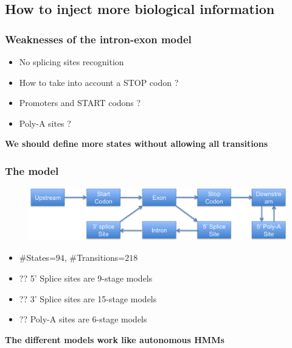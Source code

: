 \documentclass{beamer}[12pt]
\begin{document}
\subsection{How to inject more biological information}
\begin{frame}
\frametitle{Weaknesses of the intron-exon model}
	\begin{itemize}
		\item No splicing sites recognition 
		\item How to take into account a STOP codon ? 
		\item Promoters and START codons ? 
		\item Poly-A sites ?
	\end{itemize}
	
	\vspace{0.5cm}
	
	\pause\begin{center}
		\textbf{We should define more states without allowing all transitions}
	\end{center}
	
\end{frame}

\begin{frame}
\frametitle{The model}
	\begin{figure}
	\includegraphics[width=1.0\textwidth]{../picturesforthepresentation/combinedHMM.png}
	\end{figure}
	
	\begin{itemize}
		\item $\#$States=$94$, $\#$Transitions=$218$
		\item ?? 5' Splice sites are 9-stage models
		\item ?? 3' Splice sites are 15-stage models
		\item ?? Poly-A sites are 6-stage models
	\end{itemize}
	
	\pause\begin{center}
		\textbf{The different models work like autonomous HMMs}
	\end{center}
	
\end{frame}
\end{document}
